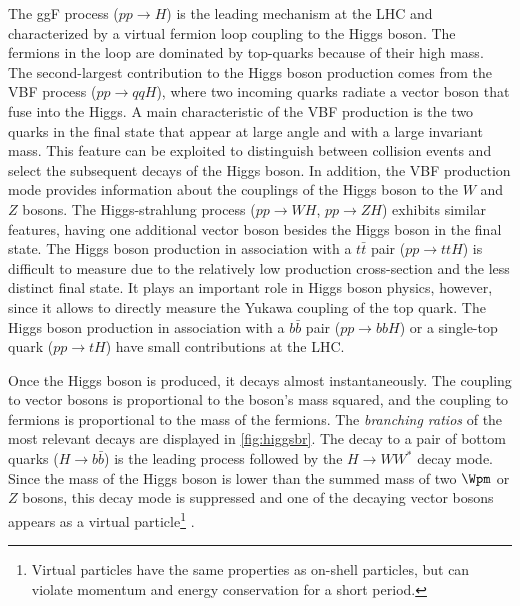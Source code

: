 The ggF process ($pp\rightarrow H$) is the leading mechanism at the LHC and characterized by a virtual fermion loop coupling to the Higgs boson. 
The fermions in the loop are dominated by top-quarks because of their high mass. 
The second-largest contribution to the Higgs boson production comes from the VBF process ($pp\rightarrow qqH$), where two incoming quarks radiate a vector boson that fuse into the Higgs.
A main characteristic of the VBF production is the two quarks in the final state that appear at large angle and with a large invariant mass.
This feature can be exploited to distinguish between collision events and select the subsequent decays of the Higgs boson. 
In addition, the VBF production mode provides information about the couplings of the Higgs boson to the $W$ and $Z$ bosons. 
The Higgs-strahlung process ($pp \rightarrow WH$, $pp \rightarrow ZH$) exhibits similar features, having one additional vector boson besides the Higgs boson in the final state.
The Higgs boson production in association with a $t\bar{t}$ pair ($pp \rightarrow ttH$) is difficult to measure due to the relatively low production cross-section and the less distinct final state. It plays an important role in Higgs boson physics, however, since it allows to directly measure the Yukawa coupling of the top quark. 
The Higgs boson production in association with a $b\bar{b}$ pair ($pp\rightarrow bbH$) or a single-top quark ($pp \rightarrow tH$) have small contributions at the LHC.


Once the Higgs boson is produced, it decays almost instantaneously. 
The coupling to vector bosons is proportional to the boson's mass squared, and the coupling to fermions is proportional to the mass of the fermions. The \emph{branching ratios} of the most relevant decays are displayed in \cref{fig:higgsbr}. 
The decay to a pair of bottom quarks ($H\rightarrow b\bar{b}$) is the leading process followed by the $H\rightarrow WW^*$ decay mode. Since the mass of the Higgs boson is lower than the summed mass of two $\Wpm$ or $Z$ bosons, this decay mode is suppressed and one of the decaying vector bosons appears as a virtual particle\footnote{Virtual particles have the same properties as on-shell particles, but can violate momentum and energy conservation for a short period.} .

